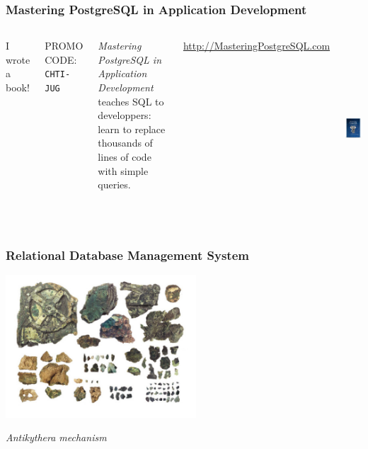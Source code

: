 \documentclass{beamer}
\begin{document}
\begin{frame}
  \frametitle{Mastering PostgreSQL in Application Development}

  \begin{columns}[c]
    \begin{minipage}[t][12em][t]{\textwidth}
      \begin{center}
        {\Huge I wrote a book!}
      \end{center}
      \begin{center}
        {\Large PROMO CODE: \texttt{CHTI-JUG}}
      \end{center}
      
      \vfill
      
      \textit{Mastering PostgreSQL in Application Development} teaches SQL
      to developpers: learn to replace thousands of lines of code with
      simple queries.

      \vfill
      \url{http://MasteringPostgreSQL.com}
    \end{minipage}

    \begin{center}
      \href{http://MasteringPostgreSQL.com}
           {\includegraphics[height=18em]{MasteringPostgreSQLinAppDev-Cover.png}}
    \end{center}
  \end{columns}
\end{frame}

\begin{frame}
  \frametitle{Relational Database Management System}

  \begin{center}
    \includegraphics[height=2.1in]{machine-d-Anticythere-c.jpg}
  \end{center}

  \vfill
  \begin{center}
    \textit{Antikythera mechanism}
  \end{center}
\end{frame}
\end{document}
